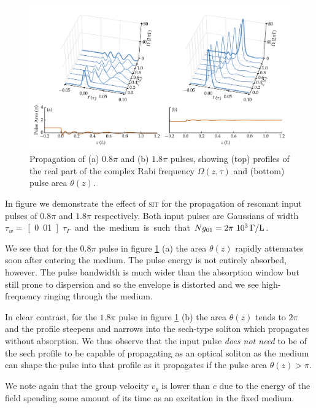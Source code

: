     \begin{figure}[]
      \includegraphics[width=\linewidth]
        {figs/03_nonlinear/coh_gaus_plot_0_8pi_1_8pi_fwhm0_010_N01000_fig1.pdf}
      \caption{
      Propagation of (a) $0.8 \pi$ and (b) $1.8 \pi$ pulses, showing (top)
      profiles of the real part of the complex Rabi frequency $\Omega(z, \tau)$
      and (bottom) pulse area $\theta(z)$.
      }
      \label{fig:sit_08_18_nodecay}
    \end{figure}

    In figure \label{fig:ref} we demonstrate the effect of \textsc{sit} for the
    propagation of resonant input pulses of $0.8 \pi$ and $1.8 \pi$
    respectively. Both input pulses are Gaussians of width $\tau_w = $
    \unit[0.01]{$\tau_\Gamma$} and the medium is such that $Ng_{01} =
    \unit[2\pi~10^3]{\Gamma/L}$.

    We see that for the $0.8 \pi$ pulse in figure \ref{fig:sit_08_18_nodecay}
    (a) the area $\theta(z)$ rapidly attenuates soon after entering the medium.
    The pulse energy is not entirely absorbed, however. The pulse bandwidth is
    much wider than the absorption window but still prone to dispersion and so
    the envelope is distorted and we see high-frequency ringing through the
    medium.

    In clear contrast, for the $1.8 \pi$ pulse in figure
    \ref{fig:sit_08_18_nodecay} (b) the area $\theta(z)$ tends to $2\pi$ and the
    profile steepens and narrows into the sech-type soliton which propagates
    without absorption. We thus observe that the input pulse \textit{does not
    need} to be of the sech profile to be capable of propagating as an optical
    soliton as the medium can shape the pulse into that profile as it propagates
    if the pulse area $\theta(z) > \pi$.

    We note again that the group velocity $v_g$ is lower than $c$ due to the
    energy of the field spending some amount of its time as an excitation in the
    fixed medium.

